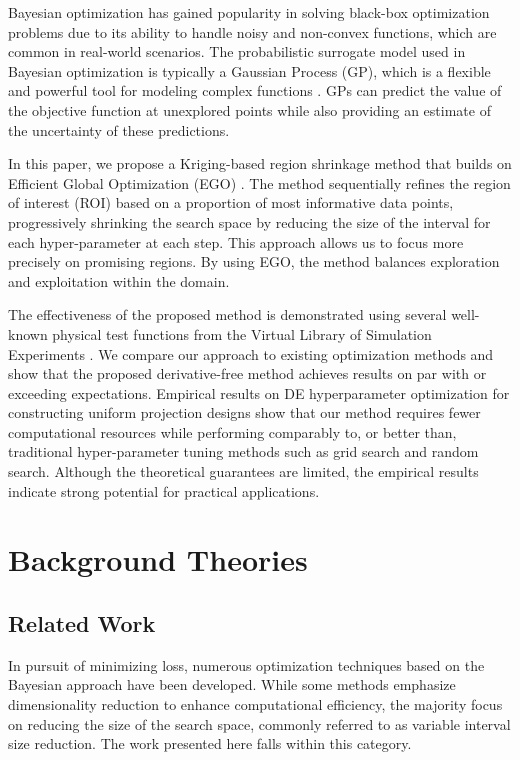 \documentclass [PhD] {package/uclathes}
\begin{document}
Bayesian optimization has gained popularity in solving black-box optimization problems due to its ability to handle noisy and non-convex functions, which are common in real-world scenarios. The probabilistic surrogate model used in Bayesian optimization is typically a Gaussian Process (GP), which is a flexible and powerful tool for modeling complex functions \parencite{rasmussen2006gaussian}. GPs can predict the value of the objective function at unexplored points while also providing an estimate of the uncertainty of these predictions.

In this paper, we propose a Kriging-based region shrinkage method that builds on Efficient Global Optimization (EGO) \parencite{jones1998efficient}. The method sequentially refines the region of interest (ROI) based on a proportion of most informative data points, progressively shrinking the search space by reducing the size of the interval for each hyper-parameter at each step. This approach allows us to focus more precisely on promising regions. By using EGO, the method balances exploration and exploitation within the domain.

The effectiveness of the proposed method is demonstrated using several well-known physical test functions from the Virtual Library of Simulation Experiments \parencite{simulationlib}. We compare our approach to existing optimization methods and show that the proposed derivative-free method achieves results on par with or exceeding expectations. Empirical results on DE hyperparameter optimization for constructing uniform projection designs show that our method requires fewer computational resources while performing comparably to, or better than, traditional hyper-parameter tuning methods such as grid search and random search. Although the theoretical guarantees are limited, the empirical results indicate strong potential for practical applications.

\section{Background Theories}
\subsection{Related Work}
In pursuit of minimizing loss, numerous optimization techniques based on the Bayesian approach have been developed. While some methods emphasize dimensionality reduction to enhance computational efficiency, the majority focus on reducing the size of the search space, commonly referred to as variable interval size reduction. The work presented here falls within this category.
\end{document}
